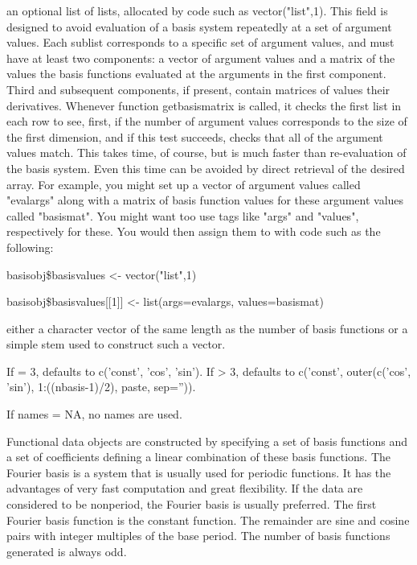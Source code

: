 \begin{Arguments}
\begin{ldescription}
\item[\code{basisvalues}] an optional list of lists, allocated by code such as
vector("list",1).  This field is designed to avoid evaluation of a
basis system repeatedly at a set of argument values.  Each sublist
corresponds to a specific set of argument values, and must have at
least two components:  a vector of argument values and a matrix of
the values the basis functions evaluated at the arguments in the
first component.  Third and subsequent components, if present,
contain matrices of values their derivatives.  Whenever function
getbasismatrix is called, it checks the first list in each row to
see, first, if the number of argument values corresponds to the size
of the first dimension, and if this test succeeds, checks that all
of the argument values match.  This takes time, of course, but is
much faster than re-evaluation of the basis system.  Even this time
can be avoided by direct retrieval of the desired array.  For
example, you might set up a vector of argument values called
"evalargs" along with a matrix of basis function values for these
argument values called "basismat".  You might want too use tags like
"args" and "values", respectively for these.  You would then assign
them to  with code such as the following:

basisobj\$basisvalues <- vector("list",1)

basisobj\$basisvalues[[1]] <- list(args=evalargs,
values=basismat)

\item[\code{names}] either a character vector of the same length as the number of basis
functions or a simple stem used to construct such a vector.

If  = 3,  defaults to c('const', 'cos',
'sin').  If  > 3,  defaults to c('const',
outer(c('cos', 'sin'), 1:((nbasis-1)/2), paste, sep='')).

If names = NA, no names are used.

\end{ldescription}
\end{Arguments}
\begin{Details}\relax
Functional data objects are constructed by specifying a set of basis
functions and a set of coefficients defining a linear combination of
these basis functions.  The Fourier basis is a system
that is usually used for periodic functions.  It has the advantages
of very fast computation and great flexibility.   If the data are
considered to be nonperiod, the Fourier basis is usually preferred.
The first Fourier basis function is the constant function.  The
remainder are sine and cosine pairs with integer multiples of the
base period. The number of basis functions generated is always odd.
\end{Details}
